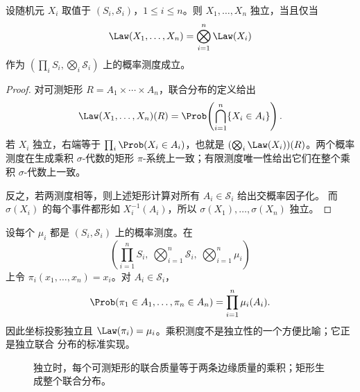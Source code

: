 \begin{theorem}[联合分布判别]\label{theorem:5-1-2-2}
设随机元 $X_i$ 取值于 $(S_i,\mathcal S_i)$，$1\le i\le n$。则
$X_1,\ldots,X_n$ 独立，当且仅当
\[
 \Law(X_1,\ldots,X_n)=\bigotimes_{i=1}^n\Law(X_i)
\]
作为 $(\prod_iS_i,\bigotimes_i\mathcal S_i)$ 上的概率测度成立。
\end{theorem}

\begin{proof}
对可测矩形 $R=A_1\times\cdots\times A_n$，联合分布的定义给出
\[
 \Law(X_1,\ldots,X_n)(R)
 =\Prob\!\left(\bigcap_{i=1}^n\{X_i\in A_i\}\right).
\]
若 $X_i$ 独立，右端等于 $\prod_i\Prob(X_i\in A_i)$，也就是
$(\bigotimes_i\Law(X_i))(R)$。两个概率测度在生成乘积 $\sigma$-代数的矩形
$\pi$-系统上一致；有限测度唯一性给出它们在整个乘积 $\sigma$-代数上一致。

反之，若两测度相等，则上述矩形计算对所有 $A_i\in\mathcal S_i$ 给出交概率因子化。
而 $\sigma(X_i)$ 的每个事件都形如 $X_i^{-1}(A_i)$，所以
$\sigma(X_1),\ldots,\sigma(X_n)$ 独立。
\end{proof}

\begin{example}[乘积坐标]\label{ex:5-1-2-1}
设每个 $\mu_i$ 都是 $(S_i,\mathcal S_i)$ 上的概率测度。在
\[
 \left(\prod_{i=1}^nS_i,\ \bigotimes_{i=1}^n\mathcal S_i,\
 \bigotimes_{i=1}^n\mu_i\right)
\]
上令 $\pi_i(x_1,\ldots,x_n)=x_i$。对 $A_i\in\mathcal S_i$，
\[
 \Prob(\pi_1\in A_1,\ldots,\pi_n\in A_n)
 =\prod_{i=1}^n\mu_i(A_i).
\]
因此坐标投影独立且 $\Law(\pi_i)=\mu_i$。乘积测度不是独立性的一个方便比喻；它正是独立联合
分布的标准实现。
\end{example}

\begin{figure}[htbp]
\centering
{}
\caption{独立时，每个可测矩形的联合质量等于两条边缘质量的乘积；矩形生成整个联合分布。}
\label{fig:5-1-2-rectangle-law}
\end{figure}

